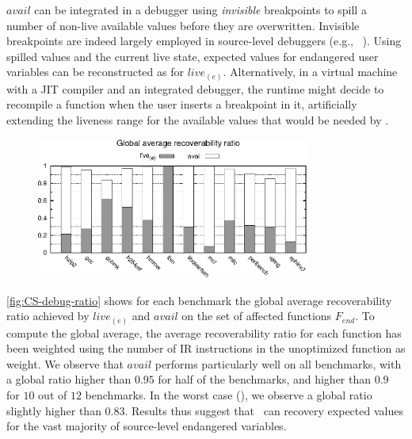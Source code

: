 $avail$ can be integrated in a debugger using {\em invisible} breakpoints to spill a number of non-live available values before they are overwritten. Invisible breakpoints are indeed largely employed in source-level debuggers (e.g., ~\cite{Zellweger83,Wu99,Jaramillo00}). Using spilled values and the current live state, expected values for endangered user variables can be reconstructed as for $live_{(e)}$. Alternatively, in a virtual machine with a JIT compiler and an integrated debugger, the runtime might decide to recompile a function when the user inserts a breakpoint in it, artificially extending the liveness range for the available values that would be needed by \buildcomp.

\begin{figure}[!ht]
\begin{center}
\includegraphics[width=0.8\textwidth]{figures/CS-debug-ratio/CS-debug-ratio.eps}
\caption{\protect}
\end{center}
\end{figure}

\noindent \myfigure\ref{fig:CS-debug-ratio} shows for each benchmark the global average recoverability ratio achieved by $live_{(e)}$ and $avail$ on the set of affected functions $F_{end}$. To compute the global average, the average recoverability ratio for each function has been weighted using the number of IR instructions in the unoptimized function as weight. We observe that $avail$ performs particularly well on all benchmarks, with a global ratio higher than $0.95$ for half of the benchmarks, and higher than $0.9$ for $10$ out of $12$ benchmarks. In the worst case (), we observe a global ratio slightly higher than $0.83$. Results thus suggest that \buildcomp\ can recovery expected values for the vast majority of source-level endangered variables.

